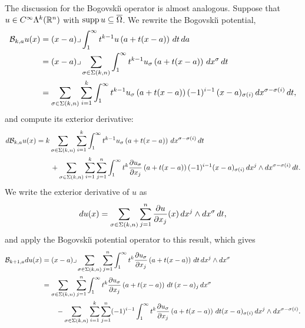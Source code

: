 \documentclass[10pt,letterpaper]{article}
\begin{document}
The discussion for the Bogovski\u{\i} operator is almost analogous. 
Suppose that $u \in C^{\infty}\Lambda^{k}({\mathbb R}^n)$ with $\operatorname{supp} u \subseteq \overline\Omega$.
We rewrite the Bogovski\u{\i} potential,
\begin{align*}
    {\mathcal B}_{k,a} u(x) 
    &= 
    (x-a)\lrcorner \int_{1}^\infty t^{k-1} u\left(a+t(x-a)\right)\,dt\,da\;
    \\&
    = 
    (x-a)\lrcorner 
    \sum_{\sigma \in \Sigma(k,n)}
    \int_{1}^\infty 
    t^{k-1} u_{\sigma}\left(a+t(x-a)\right) \,dx^{\sigma} \,dt 
    \\&
    = 
    \sum_{\sigma \in \Sigma(k,n)} \sum_{i=1}^{k}
    \int_{1}^\infty 
    t^{k-1} u_{\sigma}\left(a+t(x-a)\right) (-1)^{i-1} \,(x-a)_{\sigma(i) } \,dx^{\sigma-\sigma(i)} \,dt 
    ,
\end{align*}
and compute its exterior derivative:
\begin{align*}
    d {\mathcal B}_{k,a} u(x) 
    &= 
    k 
    \sum_{\sigma \in \Sigma(k,n)} \sum_{i=1}^{k}
    \int_{1}^\infty 
    t^{k-1} u_{\sigma}\left(a+t(x-a)\right) \,dx^{\sigma-\sigma(i)} \,dt 
    \\&\qquad
    + 
    \sum_{\sigma \in \Sigma(k,n)} \sum_{i=1}^{k} \sum_{j=1}^{n}
    \int_{1}^\infty 
    t^{k} \frac{ \partial u_{\sigma} }{\partial x_{j}}\left(a+t(x-a)\right) (-1)^{i-1} (x-a)_{\sigma(i) } \,dx^{j} \wedge dx^{\sigma-\sigma(i)} \,dt 
    .
\end{align*}
We write the exterior derivative of $u$ as 
\begin{align*}
    d u(x)
    =
    \sum_{\sigma \in \Sigma(k,n)} \sum_{j=1}^{n}
    \frac{ \partial u }{\partial x_{j}}(x) \,dx^{j} \wedge dx^{\sigma} \,dt 
    ,
\end{align*}
and apply the Bogovski\u{\i} potential operator to this result, which gives 
\begin{align*}
    {\mathcal B}_{k+1,a} d u(x)
    &=
    (x-a)\lrcorner 
    \sum_{\sigma \in \Sigma(k,n)} \sum_{j=1}^{n}
    \int_{1}^\infty t^{k} \frac{ \partial u_{\sigma} }{\partial x_{j}}\left(a+t(x-a)\right) \,dt 
    \,dx^{j} \wedge dx^{\sigma}
    \\&
    = 
    \sum_{\sigma \in \Sigma(k,n)} \sum_{j=1}^{n}
    \int_{1}^\infty t^{k} \frac{ \partial u_{\sigma} }{\partial x_{j}}\left(a+t(x-a)\right) \,dt \,(x-a)_{j} \,dx^{\sigma}
    \\&\qquad 
    - 
    \sum_{\sigma \in \Sigma(k,n)} \sum_{i=1}^{k} \sum_{j=1}^{n}
    (-1)^{i-1}
    \int_{1}^\infty t^{k} \frac{ \partial u_{\sigma} }{\partial x_{j}}\left(a+t(x-a)\right) \,dt 
    (x-a)_{\sigma(i)} \,dx^{j} \wedge dx^{\sigma-\sigma(i)}
    .
\end{align*}
\end{document}
